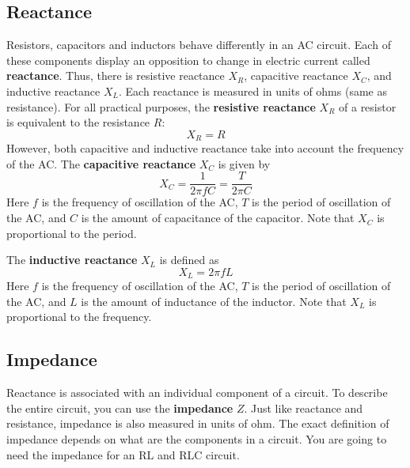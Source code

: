 \subsection{Reactance}
Resistors, capacitors and inductors behave differently in an AC circuit. Each of these components display an opposition to change in electric current called \textbf{reactance}. Thus, there is resistive reactance $X_{R}$, capacitive reactance $X_{C}$, and inductive reactance $X_{L}$. Each reactance is measured in units of ohms (same as resistance). For all practical purposes, the \textbf{resistive reactance} $X_{R}$ of a resistor is equivalent to the resistance $R$:
\begin{equation} \label{eq.06.reactance.R}
	X_{R} = R
\end{equation}
However, both capacitive and inductive reactance take into account the frequency of the AC. The \textbf{capacitive reactance} $X_{C}$ is given by
\begin{equation} \label{eq.06.reactance.C}
	X_{C} = \frac{1}{2 \pi f C} = \frac{T}{2 \pi C}
\end{equation}
Here $f$ is the frequency of oscillation of the AC, $T$ is the period of oscillation of the AC, and $C$ is the amount of capacitance of the capacitor. Note that $X_{C}$ is proportional to the period.

The \textbf{inductive reactance} $X_{L}$ is defined as
\begin{equation} \label{eq.06.reactance.L}
	X_{L} = 2 \pi f L
\end{equation}
Here $f$ is the frequency of oscillation of the AC, $T$ is the period of oscillation of the AC, and $L$ is the amount of inductance of the inductor. Note that $X_{L}$ is proportional to the frequency.
\subsection{Impedance}
Reactance is associated with an individual component of a circuit. To describe the entire circuit, you can use the \textbf{impedance} $Z$. Just like reactance and resistance, impedance is also measured in units of ohm. The exact definition of impedance depends on what are the components in a circuit. You are going to need the impedance for an RL and RLC circuit.

